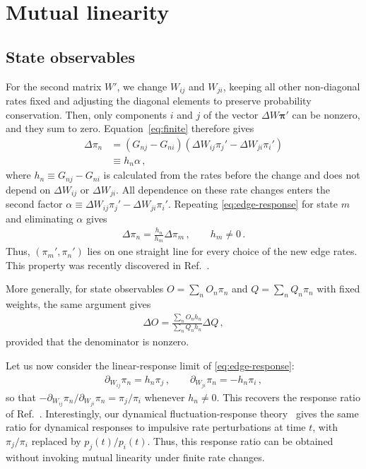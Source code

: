 \documentclass[
  reprint,
  superscriptaddress,
  amsmath,
  amssymb,
  aps,
  pre,
  longbibliography
]{revtex4-2}
\begin{document}
\section{Mutual linearity}
\label{sec:mutual-linearity}

\subsection{State observables}

For the second matrix $W'$, we change $W_{ij}$ and $W_{ji}$,
keeping all other non-diagonal rates fixed and adjusting the diagonal elements to preserve probability conservation.
Then, only components $i$ and $j$ of the vector $\Delta W\bm\pi'$ can be nonzero, and they sum to zero. Equation~\eqref{eq:finite} therefore gives
\begin{align}
    \Delta\pi_n
    &=(G_{nj}-G_{ni})
      (\Delta W_{ij}\pi_j'-\Delta W_{ji}\pi_i')
    \nonumber\\
    &\equiv h_n\alpha\,,
    \label{eq:edge-response}
\end{align}
where $h_n\equiv G_{nj}-G_{ni}$ is calculated from the rates before the change
and does not depend on $\Delta W_{ij}$ or $\Delta W_{ji}$.
All dependence on these rate changes enters the second factor
$\alpha \equiv \Delta W_{ij}\pi_j'-\Delta W_{ji}\pi_i'$.
Repeating \cref{eq:edge-response} for state $m$ and eliminating $\alpha$ gives
\begin{align}
    \Delta\pi_n=\frac{h_n}{h_m}\Delta\pi_m\,,
    \qquad h_m\ne0\,.
    \label{eq:probabilities}
\end{align}
Thus, $(\pi_m',\pi_n')$ lies on one straight line for every choice of
the new edge rates. This property was recently discovered in Ref.~\cite{BebonSpeck2026}.

More generally, for state observables $O=\sum_n O_n\pi_n$ and
$Q=\sum_n Q_n\pi_n$ with fixed weights, the same argument gives
\begin{align}
    \Delta O=\frac{\sum_n O_n h_n}{\sum_n Q_n h_n}\Delta Q\,,
    \label{eq:observables}
\end{align}
provided that the denominator is nonzero.

Let us now consider the linear-response limit of \cref{eq:edge-response}:
\begin{align}
    \partial_{W_{ij}}\pi_n=h_n\pi_j\,,\qquad
    \partial_{W_{ji}}\pi_n=-h_n\pi_i\,,
    \label{eq:derivatives}
\end{align}
so that $-\partial_{W_{ij}}\pi_n/\partial_{W_{ji}}\pi_n=\pi_j/\pi_i$
whenever $h_n\ne0$. This recovers the response ratio of
Ref.~\cite{BebonSpeck2026}.
Interestingly, our dynamical fluctuation-response theory~\cite{AslyamovEsposito2026} gives the same ratio for
dynamical responses to impulsive rate perturbations at time $t$, with
$\pi_j/\pi_i$ replaced by $p_j(t)/p_i(t)$.
Thus, this response ratio can be obtained without invoking mutual linearity under finite rate changes.
\end{document}
